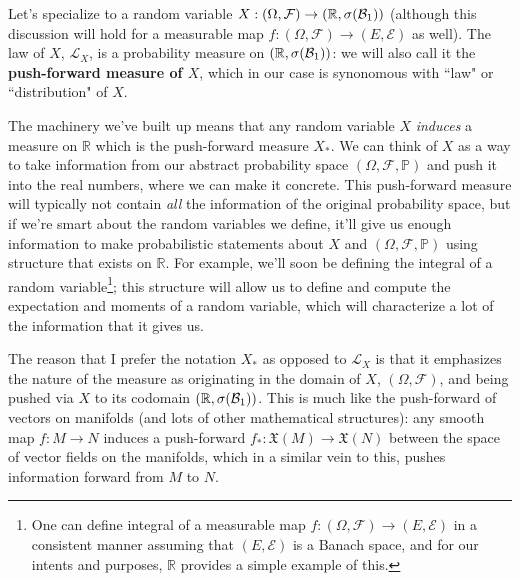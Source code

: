 \begin{example}
	Let's specialize to a random variable $X : (\Omega, \mathcal F)\rightarrow (\mathbb R, \sigma(\mathcal{B}_{1}))$ (although this discussion will hold for a measurable map $f : (\Omega, \mathcal F)\rightarrow (E, \mathcal E)$ as well). The law of $X$, $\mathcal L_X$, is a probability measure on $(\mathbb R, \sigma(\mathcal{B}_{1}))$: we will also call it the \textbf{push-forward measure of $X$}, which in our case is synonomous with ``law" or ``distribution" of $X$. 
	
	The machinery we've built up means that any random variable $X$ \textit{induces} a measure on $\mathbb R$ which is the push-forward measure $X_*$. We can think of $X$ as a way to take information from our abstract probability space $(\Omega, \mathcal F, \mathbb P)$ and push it into the real numbers, where we can make it concrete. This push-forward measure will typically not contain \textit{all} the information of the original probability space, but if we're smart about the random variables we define, it'll give us enough information to make probabilistic statements about $X$ and $(\Omega, \mathcal F, \mathbb P)$ using structure that exists on $\mathbb R$. For example, we'll soon be defining the integral of a random variable\footnote{One can define integral of a measurable map $f : (\Omega, \mathcal F)\rightarrow (E, \mathcal E)$ in a consistent manner assuming that $(E, \mathcal E)$ is a Banach space, and for our intents and purposes, $\mathbb R$ provides a simple example of this.}; this structure will allow us to define and compute the expectation and moments of a random variable, which will characterize a lot of the information that it gives us. 
	
	The reason that I prefer the notation $X_*$ as opposed to $\mathcal L_X$ is that it emphasizes the nature of the measure as originating in the domain of $X$, $(\Omega, \mathcal F)$, and being pushed via $X$ to its codomain $(\mathbb R, \sigma(\mathcal{B}_{1}))$. This is much like the push-forward of vectors on manifolds (and lots of other mathematical structures): any smooth map $f : M\rightarrow N$ induces a push-forward $f_* : \mathfrak X(M) \rightarrow \mathfrak X(N)$ between the space of vector fields on the manifolds, which in a similar vein to this, pushes information forward from $M$ to $N$. 
\end{example}

